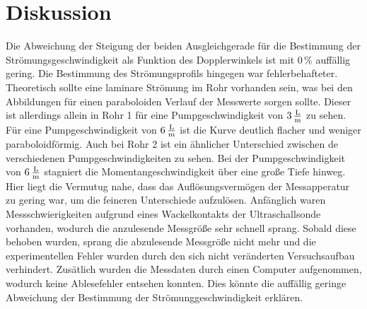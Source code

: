 \section{Diskussion}
\label{sec:Diskussion}
Die Abweichung der Steigung der beiden Ausgleichgerade für die Bestimmung der Strömungsgeschwindigkeit als Funktion des Dopplerwinkels ist mit $0 \, \%$
auffällig gering. Die Bestimmung des Strömungsprofils hingegen war fehlerbehafteter. Theoretisch sollte eine laminare Strömung im Rohr vorhanden sein, 
was bei den Abbildungen für einen paraboloiden Verlauf der Messwerte sorgen sollte. Dieser ist allerdings allein in Rohr 1 für eine Pumpgeschwindigkeit von 
$3 \, \unit[per-mode=fraction]{\liter\per\meter}$ zu sehen. Für eine Pumpgeschwindigkeit von $6 \, \unit[per-mode=fraction]{\liter\per\meter}$
ist die Kurve deutlich flacher und weniger paraboloidförmig. Auch bei Rohr 2 ist ein ähnlicher 
Unterschied zwischen de verschiedenen Pumpgeschwindigkeiten zu sehen. Bei der Pumpgeschwindigkeit von 
$6 \, \unit[per-mode=fraction]{\liter\per\meter}$ stagniert die Momentangeschwindigkeit über eine 
große Tiefe hinweg. Hier liegt die Vermutug nahe, dass das Auflösungsvermögen der Messapperatur zu gering war,
um die feineren Unterschiede aufzulösen. 
Anfänglich waren Messschwierigkeiten aufgrund eines Wackelkontakts der Ultraschallsonde vorhanden, wodurch die anzulesende Messgröße sehr schnell sprang. 
Sobald diese behoben wurden, sprang die abzulesende Messgröße nicht mehr und die experimentellen Fehler wurden durch den sich nicht veränderten Versuchsaufbau
verhindert. Zusätlich wurden die Messdaten durch einen Computer aufgenommen, wodurch keine Ablesefehler entsehen
konnten. Dies könnte die auffällig geringe Abweichung der Bestimmung der Strömunggeschwindigkeit erklären. 